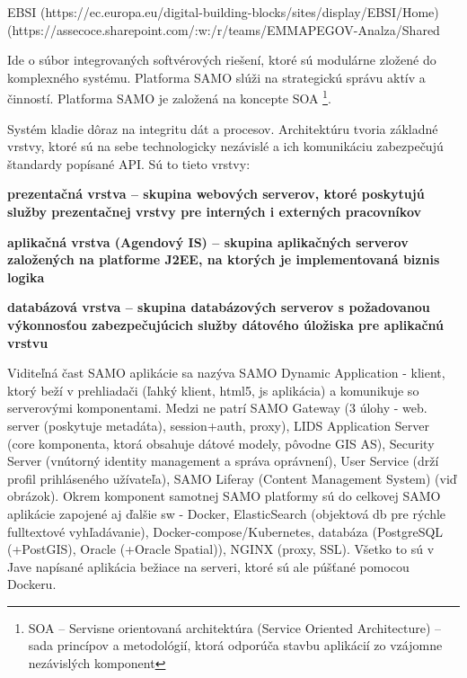 \TODO EBSI (https://ec.europa.eu/digital-building-blocks/sites/display/EBSI/Home) (https://assecoce.sharepoint.com/:w:/r/teams/EMMAPEGOV-Analza/Shared%

Ide o súbor integrovaných softvérových riešení, ktoré sú modulárne zložené do komplexného systému. Platforma SAMO slúži na strategickú správu aktív a činností. Platforma SAMO je založená na koncepte SOA \footnote{SOA -- Servisne orientovaná architektúra (Service Oriented Architecture) -- sada princípov a metodológií, ktorá odporúča stavbu aplikácií zo vzájomne nezávislých komponent}. %


Systém kladie dôraz na integritu dát a procesov. Architektúru tvoria základné vrstvy, ktoré sú na sebe technologicky nezávislé a ich komunikáciu zabezpečujú štandardy popísané API. Sú to tieto vrstvy:

\startitemize
\item \start\bf prezentačná vrstva \stop -- skupina webových serverov, ktoré poskytujú služby prezentačnej vrstvy pre interných i externých pracovníkov
\item \start\bf aplikačná vrstva \stop (Agendový IS) -- skupina aplikačných serverov založených na platforme J2EE, na ktorých je implementovaná biznis logika
\item  \start\bf databázová vrstva \stop -- skupina databázových serverov s požadovanou výkonnosťou zabezpečujúcich služby dátového úložiska pre aplikačnú vrstvu
\stopitemize

Viditeľná čast SAMO aplikácie sa nazýva SAMO Dynamic Application - klient, ktorý beží v prehliadači (ľahký klient, html5, js aplikácia) a komunikuje so serverovými komponentami. Medzi ne patrí SAMO Gateway (3 úlohy - web. server (poskytuje metadáta), session+auth, proxy), LIDS Application Server (core komponenta, ktorá obsahuje dátové modely, pôvodne GIS AS), Security Server (vnútorný identity management a správa oprávnení), User Service (drží profil prihláseného užívateľa), SAMO Liferay (Content Management System) (viď obrázok). Okrem komponent samotnej SAMO platformy sú do celkovej SAMO aplikácie zapojené aj ďalšie sw - Docker, ElasticSearch (objektová db pre rýchle fulltextové vyhľadávanie), Docker-compose/Kubernetes, databáza (PostgreSQL (+PostGIS), Oracle (+Oracle Spatial)), NGINX (proxy, SSL). Všetko to sú v Jave napísané aplikácia bežiace na serveri, ktoré sú ale púšťané pomocou Dockeru.

